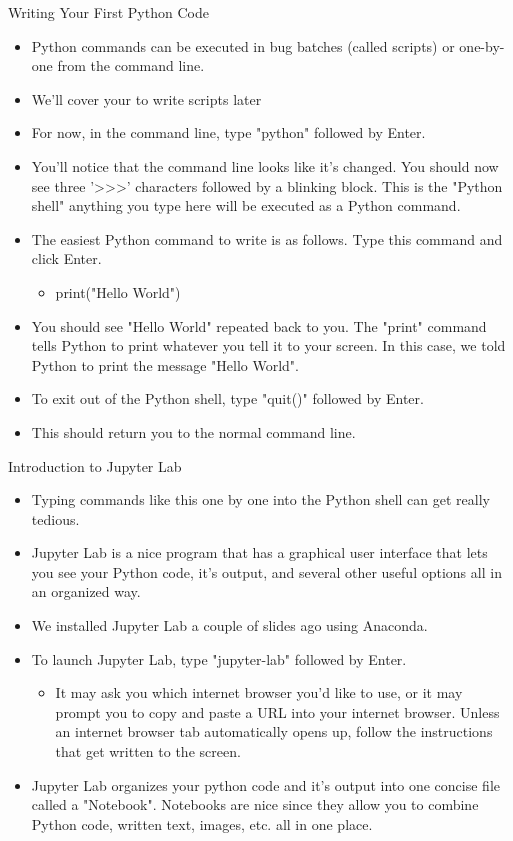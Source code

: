 \documentclass[10pt, aspectratio=169]{beamer}
\begin{document}
\begin{frame}{Writing Your First Python Code}
    \begin{itemize}
        \item Python commands can be executed in bug batches (called scripts) or one-by-one from the command line.
        \item We'll cover your to write scripts later
        \item For now, in the command line, type "python" followed by Enter.
        \item You'll notice that the command line looks like it's changed. You should now see three '\textgreater\textgreater\textgreater' characters followed by a blinking block. This is the "Python shell" anything you type here will be executed as a Python command.
        \item The easiest Python command to write is as follows. Type this command and click Enter.
        \begin{itemize}
            \item print("Hello World")
        \end{itemize}
        \item You should see "Hello World" repeated back to you. The "print" command tells Python to print whatever you tell it to your screen. In this case, we told Python to print the message "Hello World".
        \item To exit out of the Python shell, type "quit()" followed by Enter.
        \item This should return you to the normal command line.
    \end{itemize}
\end{frame}

\begin{frame}{Introduction to Jupyter Lab}
    \begin{itemize}
        \item Typing commands like this one by one into the Python shell can get really tedious.
        \item Jupyter Lab is a nice program that has a graphical user interface that lets you see your Python code, it's output, and several other useful options all in an organized way.
        \item We installed Jupyter Lab a couple of slides ago using Anaconda.
        \item To launch Jupyter Lab, type "jupyter-lab" followed by Enter.
        \begin{itemize}
            \item It may ask you which internet browser you'd like to use, or it may prompt you to copy and paste a URL into your internet browser. Unless an internet browser tab automatically opens up, follow the instructions that get written to the screen.
        \end{itemize}
        \item Jupyter Lab organizes your python code and it's output into one concise file called a "Notebook". Notebooks are nice since they allow you to combine Python code, written text, images, etc. all in one place.
    \end{itemize}
\end{frame}
\end{document}
